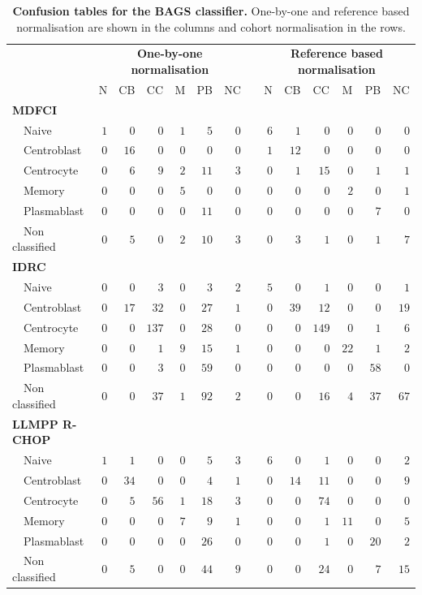 \documentclass[10pt]{bmc_article}
\newenvironment{bmcformat}{\fussy\setboolean{publ}{true}}{\fussy}
\begin{document}
\begin{bmcformat}
\begin{table}[!tbp]
\small
\caption{\textbf{Confusion tables for the BAGS classifier.} One-by-one and reference based normalisation are shown in the columns and cohort normalisation in the rows.\label{tab:BAGShemaclass}}
\begin{center}
\begin{tabular}{lrrrrrrcrrrrrr}
\toprule
\multicolumn{1}{l}{\bfseries  }&\multicolumn{6}{c}{\bfseries One-by-one normalisation}&\multicolumn{1}{c}{\bfseries }&\multicolumn{6}{c}{\bfseries Reference based normalisation}\tabularnewline
\cline{2-7} \cline{9-14}
\multicolumn{1}{l}{}&\multicolumn{1}{c}{N}&\multicolumn{1}{c}{CB}&\multicolumn{1}{c}{CC}&\multicolumn{1}{c}{M}&\multicolumn{1}{c}{PB}&\multicolumn{1}{c}{NC}&\multicolumn{1}{c}{}&\multicolumn{1}{c}{N}&\multicolumn{1}{c}{CB}&\multicolumn{1}{c}{CC}&\multicolumn{1}{c}{M}&\multicolumn{1}{c}{PB}&\multicolumn{1}{c}{NC}\tabularnewline
\hline
{\bfseries MDFCI}&&&&&&&&&&&&&\tabularnewline
~~Naive&$1$&$ 0$&$  0$&$1$&$ 5$&$0$&&$6$&$ 1$&$  0$&$ 0$&$ 0$&$ 0$\tabularnewline
~~Centroblast&$0$&$16$&$  0$&$0$&$ 0$&$0$&&$1$&$12$&$  0$&$ 0$&$ 0$&$ 0$\tabularnewline
~~Centrocyte&$0$&$ 6$&$  9$&$2$&$11$&$3$&&$0$&$ 1$&$ 15$&$ 0$&$ 1$&$ 1$\tabularnewline
~~Memory&$0$&$ 0$&$  0$&$5$&$ 0$&$0$&&$0$&$ 0$&$  0$&$ 2$&$ 0$&$ 1$\tabularnewline
~~Plasmablast&$0$&$ 0$&$  0$&$0$&$11$&$0$&&$0$&$ 0$&$  0$&$ 0$&$ 7$&$ 0$\tabularnewline
~~Non classified&$0$&$ 5$&$  0$&$2$&$10$&$3$&&$0$&$ 3$&$  1$&$ 0$&$ 1$&$ 7$\tabularnewline
\hline
{\bfseries IDRC}&&&&&&&&&&&&&\tabularnewline
~~Naive&$0$&$ 0$&$  3$&$0$&$ 3$&$2$&&$5$&$ 0$&$  1$&$ 0$&$ 0$&$ 1$\tabularnewline
~~Centroblast&$0$&$17$&$ 32$&$0$&$27$&$1$&&$0$&$39$&$ 12$&$ 0$&$ 0$&$19$\tabularnewline
~~Centrocyte&$0$&$ 0$&$137$&$0$&$28$&$0$&&$0$&$ 0$&$149$&$ 0$&$ 1$&$ 6$\tabularnewline
~~Memory&$0$&$ 0$&$  1$&$9$&$15$&$1$&&$0$&$ 0$&$  0$&$22$&$ 1$&$ 2$\tabularnewline
~~Plasmablast&$0$&$ 0$&$  3$&$0$&$59$&$0$&&$0$&$ 0$&$  0$&$ 0$&$58$&$ 0$\tabularnewline
~~Non classified&$0$&$ 0$&$ 37$&$1$&$92$&$2$&&$0$&$ 0$&$ 16$&$ 4$&$37$&$67$\tabularnewline
\hline
{\bfseries LLMPP R-CHOP}&&&&&&&&&&&&&\tabularnewline
~~Naive&$1$&$ 1$&$  0$&$0$&$ 5$&$3$&&$6$&$ 0$&$  1$&$ 0$&$ 0$&$ 2$\tabularnewline
~~Centroblast&$0$&$34$&$  0$&$0$&$ 4$&$1$&&$0$&$14$&$ 11$&$ 0$&$ 0$&$ 9$\tabularnewline
~~Centrocyte&$0$&$ 5$&$ 56$&$1$&$18$&$3$&&$0$&$ 0$&$ 74$&$ 0$&$ 0$&$ 0$\tabularnewline
~~Memory&$0$&$ 0$&$  0$&$7$&$ 9$&$1$&&$0$&$ 0$&$  1$&$11$&$ 0$&$ 5$\tabularnewline
~~Plasmablast&$0$&$ 0$&$  0$&$0$&$26$&$0$&&$0$&$ 0$&$  1$&$ 0$&$20$&$ 2$\tabularnewline
~~Non classified&$0$&$ 5$&$  0$&$0$&$44$&$9$&&$0$&$ 0$&$ 24$&$ 0$&$ 7$&$15$\tabularnewline

\end{tabular}
\end{center}
\end{table}
\end{bmcformat}
\end{document}
